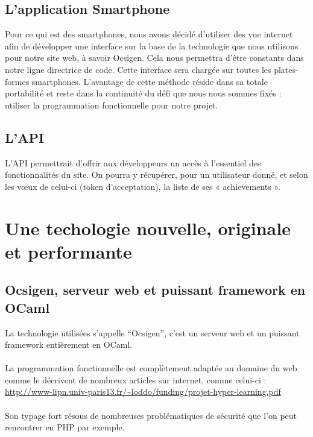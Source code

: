 \documentclass{life-fr}
\begin{document}
\section{L'application Smartphone}

Pour ce qui est des smartphones, nous avons décidé d'utiliser des vue internet afin de développer une interface sur la base de la technologie que nous utilisons pour notre site web, à savoir Ocsigen. Cela nous permettra d'être constants dans notre ligne directrice de code. Cette interface sera chargée sur toutes les plates-formes smartphones. L'avantage de cette méthode réside dans sa totale portabilité et reste dans la continuité du défi que nous nous sommes fixés : utiliser la programmation fonctionnelle pour notre projet.

\section{L'API}

L'API permettrait d'offrir aux développeurs un accès à l'essentiel des fonctionnalités du site. On pourra y récupérer, pour un utilisateur donné, et selon les vœux de celui-ci (token d'acceptation), la liste de ses « achievements ».



\chapter{Une techologie nouvelle, originale et performante}

\section{Ocsigen, serveur web et puissant framework en OCaml}

La technologie utilisées s'appelle ``Ocsigen'', c'est un serveur web et un puissant framework entièrement en OCaml.\\
  \\
La programmation fonctionnelle est complètement adaptée au domaine du web comme le décrivent de nombreux articles sur internet, comme celui-ci :\\
\url{http://www-lipn.univ-paris13.fr/~loddo/funding/projet-hyper-learning.pdf}\\
\\
Son typage fort résous de nombreuses problématiques de sécurité que l'on peut rencontrer en PHP par exemple.\\
\end{document}
